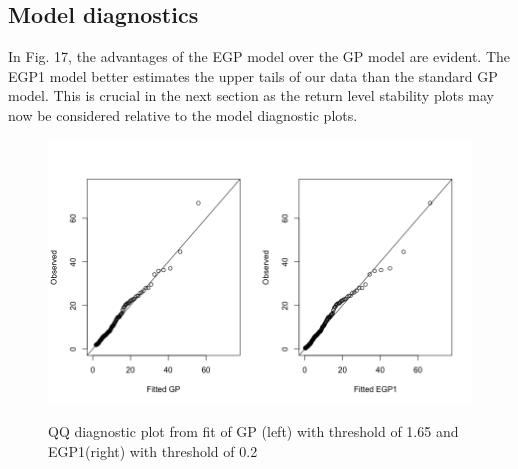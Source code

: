 \documentclass[12pt]{article}
\theoremstyle{definition}
\theoremstyle{definition}
\begin{document}
\subsection{Model diagnostics}
In Fig. 17, the advantages of the EGP model over the GP model are evident. The EGP1 model better estimates the upper tails of our data than the standard GP model. This is crucial in the next section as the return level stability plots may now be considered relative to the model diagnostic plots.
\begin{figure}[H]
\begin{center}
{\includegraphics[width=3.in]{project/papafiles/rain.qq.png}}
\caption{QQ diagnostic plot from fit of GP (left) with threshold of 1.65 and EGP1(right) with threshold of 0.2}
\end{center}
\end{figure}
\end{document}
